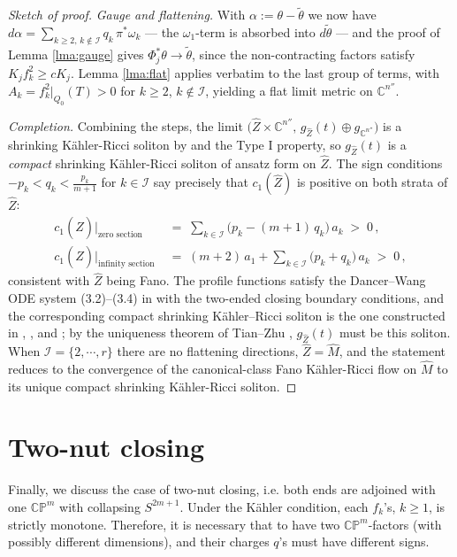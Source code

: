 \documentclass[11pt]{amsart}
\theoremstyle{plain}
\numberwithin{equation}{section}
\theoremstyle{definition}
\theoremstyle{remark}
\begin{document}
\begin{proof}[Sketch of proof]
\emph{Gauge and flattening.} With $\alpha := \theta - \widetilde\theta$ we now have $d\alpha = \sum_{k\geq 2,\,k\not\in\mathcal{I}}q_k\,\pi^*\omega_k$ --- the $\omega_1$-term is absorbed into $d\widetilde\theta$ --- and the proof of Lemma \ref{lma:gauge} gives $\Phi_j^*\theta \to \widetilde\theta$, since the non-contracting factors satisfy $K_jf_k^2 \geq cK_j$. Lemma \ref{lma:flat} applies verbatim to the last group of terms, with $A_k = f_k^2\big|_{Q_0}(T) > 0$ for $k \geq 2$, $k \not\in \mathcal{I}$, yielding a flat limit metric on $\mathbb{C}^{n''}$.

\emph{Completion.} Combining the steps, the limit $\big(\widehat{Z}\times\mathbb{C}^{n''}, \, g_{\widehat{Z}}(t)\oplus g_{\mathbb{C}^{n''}}\big)$ is a shrinking K\"ahler-Ricci soliton by \cite{EMT, Naber} and the Type I property, so $g_{\widehat{Z}}(t)$ is a \emph{compact} shrinking K\"ahler-Ricci soliton of ansatz form on $\widehat{Z}$. The sign conditions $-p_k < q_k < \frac{p_k}{m+1}$ for $k \in \mathcal{I}$ say precisely that $c_1(\widehat{Z})$ is positive on both strata of $\widehat{Z}$:
\begin{align*}
c_1(\widehat{Z})\Big|_{\text{zero section}} & \;=\; \sum_{k\in\mathcal{I}}\big(p_k - (m+1)\,q_k\big)\,a_k \;>\; 0\,,\\
c_1(\widehat{Z})\Big|_{\text{infinity section}} & \;=\; (m+2)\,a_1 + \sum_{k\in\mathcal{I}}\big(p_k+q_k\big)\,a_k \;>\; 0\,,
\end{align*}
consistent with $\widehat{Z}$ being Fano. The profile functions satisfy the Dancer--Wang ODE system (3.2)--(3.4) in \cite{DW2011} with the two-ended closing boundary conditions, and the corresponding compact shrinking K\"ahler--Ricci soliton is the one constructed in \cite{Koiso}, \cite{Cao96}, and \cite{DW2011}; by the uniqueness theorem of Tian--Zhu \cite{TZhu}, $g_{\widehat{Z}}(t)$ must be this soliton. When $\mathcal{I} = \{2,\cdots,r\}$ there are no flattening directions, $\widehat{Z} = \widehat{M}$, and the statement reduces to the convergence of the canonical-class Fano K\"ahler-Ricci flow on $\widehat{M}$ to its unique compact shrinking K\"ahler-Ricci soliton.
\end{proof}


\section{Two-nut closing}\label{sec:twonut}
Finally, we discuss the case of two-nut closing, i.e. both ends are adjoined with one $\mathbb{CP}^m$ with collapsing $S^{2m+1}$. Under the K\"ahler condition, each $f_k$'s, $k \geq 1$, is strictly monotone. Therefore, it is necessary that to have two $\mathbb{CP}^m$-factors (with possibly different dimensions), and their charges $q$'s must have different signs.
\end{document}
